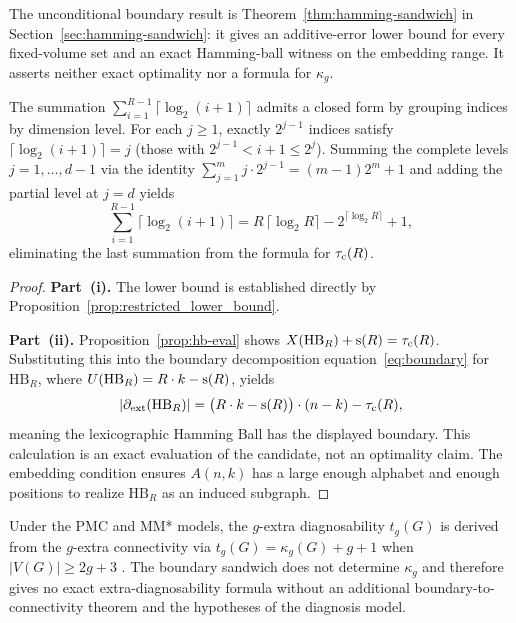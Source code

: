 The unconditional boundary result is Theorem~\ref{thm:hamming-sandwich} in
Section~\ref{sec:hamming-sandwich}: it gives an additive-error lower bound
for every fixed-volume set and an exact Hamming-ball witness on the embedding
range. It asserts neither exact optimality nor a formula for $\kappa_g$.

\begin{remark}
The summation $\sum_{i=1}^{R-1} \lceil \log_2(i+1) \rceil$ admits a closed form
by grouping indices by dimension level. For each $j \ge 1$, exactly $2^{j-1}$
indices satisfy $\lceil \log_2(i+1) \rceil = j$ (those with $2^{j-1} < i+1 \le
2^j$). Summing the complete levels $j = 1, \ldots, d-1$ via the identity
$\sum_{j=1}^{m} j \cdot 2^{j-1} = (m-1) 2^m + 1$ and adding the partial level at
$j = d$ yields
	\begin{equation}\label{eq:ceillog-sum}
		\sum_{i=1}^{R-1} \lceil \log_2(i+1) \rceil = R\,\lceil \log_2 R \rceil - 2^{\lceil \log_2 R \rceil} + 1,
	\end{equation}
	eliminating the last summation from the formula for $\tau_{\mathrm{c}}(R)$.
\end{remark}

\begin{proof}
\textbf{Part~(i).} The lower bound is established directly by
Proposition~\ref{prop:restricted_lower_bound}.

\textbf{Part~(ii).} Proposition~\ref{prop:hb-eval} shows $X(\mathrm{HB}_R) +
\mathrm{s}(R) = \tau_{\mathrm{c}}(R)$. Substituting this into the boundary decomposition
equation~\eqref{eq:boundary} for $\mathrm{HB}_R$, where $U(\mathrm{HB}_R) = R
\cdot k - \mathrm{s}(R)$, yields
	\begin{equation}
		\left|\partial_{\mathrm{ext}}(\mathrm{HB}_R)\right| = \big(R \cdot k - \mathrm{s}(R)\big) \cdot (n - k) - \tau_{\mathrm{c}}(R),
	\end{equation}
meaning the lexicographic Hamming Ball has the displayed boundary. This
calculation is an exact evaluation of the candidate, not an optimality claim.
The embedding condition ensures $A(n,k)$ has a large enough alphabet and
enough positions to realize $\mathrm{HB}_R$ as an induced subgraph.
\end{proof}

\begin{corollary}\label{cor:diagnosis}
Under the PMC and MM* models, the $g$-extra diagnosability $t_g(G)$ is derived
from the $g$-extra connectivity via $t_g(G) = \kappa_g(G) + g + 1$ when $|V(G)|
\ge 2g + 3$ \cite{cheng2023augmented}. The boundary sandwich does not determine
$\kappa_g$ and therefore gives no exact extra-diagnosability formula without
an additional boundary-to-connectivity theorem and the hypotheses of the
diagnosis model.
\end{corollary}

